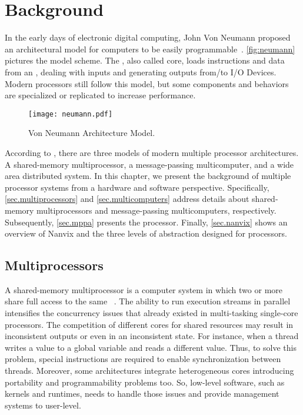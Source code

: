 \chapter{Background}
\label{ch.fundamentation}

	In the early days of electronic digital computing, John Von Neumann
	proposed an architectural model for computers to be easily programmable~\cite{von-neumann:model}.
	\autoref{fig:neumann} pictures the model scheme.
	The \cpu, also called core, loads instructions and data from an \mmu,
	dealing with inputs and generating outputs from/to I/O Devices.
	Modern processors still follow this model, but some components and
	behaviors are specialized or replicated to increase performance.

	\begin{figure}[!tb]
		\centering%
		\caption{Von Neumann Architecture Model.}%
		\label{fig:neumann}%
		\texttt{[image: neumann.pdf]}%
	\end{figure}
	
	According to , there are three models of
	modern multiple processor architectures.
	A shared-memory multiprocessor, a message-passing multicomputer, and a wide
	area distributed system.
	In this chapter, we present the background of multiple processor systems from
	a hardware and software perspective.
	Specifically, \autoref{sec.multiprocessors} and \autoref{sec.multicomputers} address
	details about shared-memory multiprocessors and message-passing multicomputers, respectively.
	Subsequently, \autoref{sec.mppa} presents the \mppa processor.
	Finally, \autoref{sec.nanvix} shows an overview of Nanvix \os and the
	three levels of abstraction designed for \lightweight \manycores processors.

	\section{Multiprocessors}
	\label{sec.multiprocessors}

		A shared-memory multiprocessor is a computer system in which two or more \cpus
		share full access to the same \ram~\cite{tanenbaum:4ed}.
		The ability to run execution streams in parallel intensifies the concurrency
		issues that already existed in multi-tasking single-core processors.
		The competition of different cores for shared resources may result in
		inconsistent outputs or even in an inconsistent \os state.
		For instance, when a thread writes a value to a global variable and
		reads a different value. Thus, to solve this problem, special
		instructions are required to enable synchronization between
		threads.
		Moreover, some architectures integrate heterogeneous cores introducing
		portability and programmability problems too.
		So, low-level software, such as \os kernels and runtimes, needs to handle
		those issues and provide management systems to user-level.

